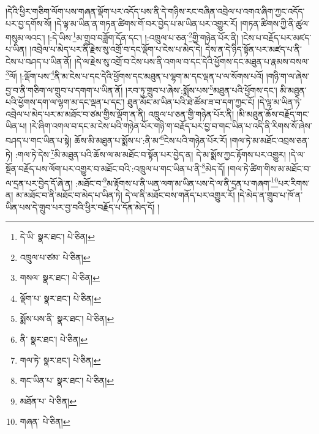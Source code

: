 །དེའི་ཕྱིར་གཅིག་ལོག་པས་གཞན་ལྡོག་པར་འདོད་པས་ནི་དེ་གཉིས་རང་བཞིན་འབྲེལ་པ་འགའ་ཞིག་ཀྱང་འདོད་པར་བྱ་དགོས་སོ། །དེ་ལྟ་མ་ཡིན་ན་གཏན་ཚིགས་གོ་བར་བྱེད་པ་མ་ཡིན་པར་འགྱུར་རོ། །གཏན་ཚིགས་ཀྱི་ནི་ཚུལ་གསུམ་ལའང་། །:དེ་ཡིས་\footnote{དེ་ཡི་  སྣར་ཐང་།  པེ་ཅིན། }མ་གྲུབ་བཟློག་དོན་དང་། །:འཁྲུལ་པ་ཅན་\footnote{འཁྲུལ་པ་ཙམ་  པེ་ཅིན། }གྱི་གཉེན་པོར་ནི། །ངེས་པ་བརྗོད་པར་མཛད་པ་ཡིན། །འབྲེལ་པ་མེད་པར་ནི་རྗེས་སུ་འགྲོ་བ་དང་ལྡོག་པ་ངེས་པ་མེད་དེ། དེས་ན་དེ་ཉིད་སྟོན་པར་མཛད་པ་ནི་ངེས་པ་བཤད་པ་ཡིན་ནོ། །དེ་ལ་རྗེས་སུ་འགྲོ་བ་ངེས་པས་ནི་འགལ་བ་དང་དེའི་ཕྱོགས་དང་མཐུན་པ་རྣམས་བསལ་\footnote{གསལ་  སྣར་ཐང་།  པེ་ཅིན། }ལོ། །:ལྡོག་པས་\footnote{ལྡོག་པ་  སྣར་ཐང་།  པེ་ཅིན། }ནི་མ་ངེས་པ་དང་དེའི་ཕྱོགས་དང་མཐུན་པ་ལྷག་མ་དང་ལྡན་པ་ལ་སོགས་པའོ། །གཉི་ག་ལ་ཞེས་བྱ་བ་ནི་གཅིག་ལ་གྲུབ་པ་དགག་པ་ཡིན་ནོ། །རབ་ཏུ་གྲུབ་པ་ཞེས་:སྨོས་པས་\footnote{སྨོས་པས་ནི་  སྣར་ཐང་།  པེ་ཅིན། }མཐུན་པའི་ཕྱོགས་དང་། མི་མཐུན་པའི་ཕྱོགས་དག་ལ་ལྷག་མ་དང་ལྡན་པ་དང་། ཐུན་མོང་མ་ཡིན་པའི་ཐེ་ཚོམ་ཟ་བ་དག་ཀྱང་ངོ། །དེ་ལྟ་མ་ཡིན་ཏེ་འབྲེལ་པ་མེད་པར་མ་མཐོང་བ་ཙམ་གྱིས་ལྡོག་ན་ནི། འཁྲུལ་པ་ཅན་གྱི་གཉེན་པོར་ནི། །མི་མཐུན་ཆོས་བརྗོད་གང་ཡིན་པ། །རེ་ཞིག་འགལ་བ་དང་མ་ངེས་པའི་གཉེན་པོར་གཉི་ག་བརྗོད་པར་བྱ་བ་གང་ཡིན་པ་འདི་ནི་རིགས་སོ་ཞེས་བཤད་པ་གང་ཡིན་པ་སྟེ། ཆོས་མི་མཐུན་པ་སྨོས་པ་:ནི་མ་\footnote{ནི་  སྣར་ཐང་།  པེ་ཅིན། }ངེས་པའི་གཉེན་པོར་རོ། །གལ་ཏེ་མ་མཐོང་འབྲས་ཅན་ཏེ། :གལ་ཏེ་དེས་\footnote{གལ་ཏེ་  སྣར་ཐང་།  པེ་ཅིན། }མི་མཐུན་པའི་ཆོས་ལ་མ་མཐོང་བ་སྟོན་པར་བྱེད་ན། དེ་མ་སྨོས་ཀྱང་རྟོགས་པར་འགྱུར། །དེ་ལ་སྔོན་བརྗོད་པས་ལོག་པར་འགྱུར་བ་མཐོང་བའི་:འཁྲུལ་པ་གང་ཡིན་པ་ནི་\footnote{གང་ཡིན་པ་  སྣར་ཐང་།  པེ་ཅིན། }མེད་དོ། །གལ་ཏེ་ཚིག་གིས་མ་མཐོང་བ་ལ་དྲན་པར་བྱེད་དོ་ཞེ་ན། :མཐོང་བ་\footnote{མཐོན་པ་  པེ་ཅིན། }མ་རྟོགས་པ་ནི་ཡན་ལག་མ་ཡིན་པས་དེ་ལ་ནི་དྲན་པ་གཞག་\footnote{གཞན་  པེ་ཅིན། }པར་རིགས་ན། མ་མཐོང་བ་ནི་མཐོང་བ་མེད་པ་ཡིན་ཏེ། དེ་ལ་ནི་མཐོང་བས་གནོད་པར་འགྱུར་རོ། །དེ་མེད་ན་གྲུབ་པ་ཁོ་ན་ཡིན་པས་དེ་གྲུབ་པར་བྱ་བའི་ཕྱིར་བརྗོད་པ་དོན་མེད་དོ། །
